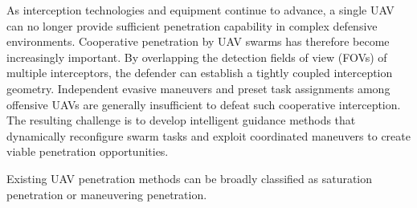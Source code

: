 \documentclass[unbranded]{cja}
\begin{document}
As interception technologies and equipment continue to advance, a single UAV can no longer provide sufficient penetration capability in complex defensive environments. Cooperative penetration by UAV swarms has therefore become increasingly important.
By overlapping the detection fields of view (FOVs) of multiple interceptors, the defender can establish a tightly coupled interception geometry. 
Independent evasive maneuvers and preset task assignments among offensive UAVs are generally insufficient to defeat such cooperative interception.
The resulting challenge is to develop intelligent guidance methods that dynamically reconfigure swarm tasks and exploit coordinated maneuvers to create viable penetration opportunities.


Existing UAV penetration methods can be broadly classified as saturation penetration or maneuvering penetration.
\end{document}
